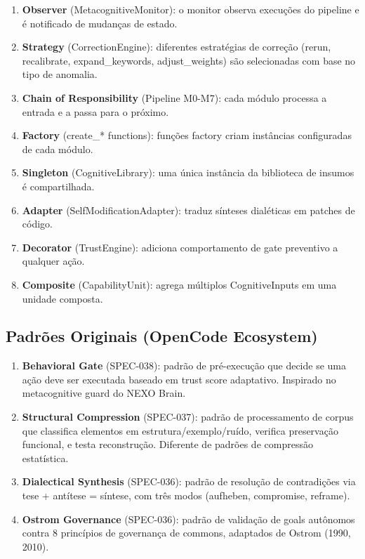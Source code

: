 \documentclass[12pt,a4paper,oneside]{abntex2}
\begin{document}
\begin{apendicesenv}
\begin{enumerate}
    \item \textbf{Observer} (MetacognitiveMonitor): o monitor observa execuções do pipeline e é notificado de mudanças de estado.
    \item \textbf{Strategy} (CorrectionEngine): diferentes estratégias de correção (rerun, recalibrate, expand\_keywords, adjust\_weights) são selecionadas com base no tipo de anomalia.
    \item \textbf{Chain of Responsibility} (Pipeline M0-M7): cada módulo processa a entrada e a passa para o próximo.
    \item \textbf{Factory} (create\_* functions): funções factory criam instâncias configuradas de cada módulo.
    \item \textbf{Singleton} (CognitiveLibrary): uma única instância da biblioteca de insumos é compartilhada.
    \item \textbf{Adapter} (SelfModificationAdapter): traduz sínteses dialéticas em patches de código.
    \item \textbf{Decorator} (TrustEngine): adiciona comportamento de gate preventivo a qualquer ação.
    \item \textbf{Composite} (CapabilityUnit): agrega múltiplos CognitiveInputs em uma unidade composta.
\end{enumerate}

\subsection{Padrões Originais (OpenCode Ecosystem)}

\begin{enumerate}
    \item \textbf{Behavioral Gate} (SPEC-038): padrão de pré-execução que decide se uma ação deve ser executada baseado em trust score adaptativo. Inspirado no metacognitive guard do NEXO Brain.
    \item \textbf{Structural Compression} (SPEC-037): padrão de processamento de corpus que classifica elementos em estrutura/exemplo/ruído, verifica preservação funcional, e testa reconstrução. Diferente de padrões de compressão estatística.
    \item \textbf{Dialectical Synthesis} (SPEC-036): padrão de resolução de contradições via tese + antítese = síntese, com três modos (aufheben, compromise, reframe).
    \item \textbf{Ostrom Governance} (SPEC-036): padrão de validação de goals autônomos contra 8 princípios de governança de commons, adaptados de Ostrom (1990, 2010).
\end{enumerate}


\end{apendicesenv}
\end{document}
